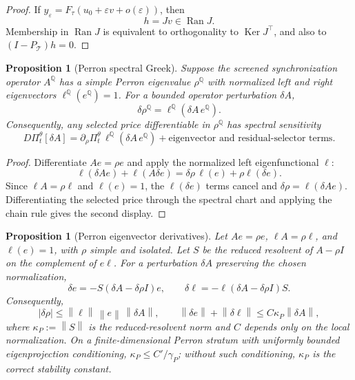 \documentclass[11pt,a4paper]{amsart}
\theoremstyle{plain}
\newtheorem{proposition}[theorem]{Proposition}
\theoremstyle{definition}
\theoremstyle{remark}
\DeclareMathOperator{\Ker}{Ker}
\DeclareMathOperator{\Ran}{Ran}
\newcommand{\QQ}{\mathbb{Q}}
\newcommand{\cT}{\mathcal{T}}
\newcommand{\eps}{\varepsilon}
\newcommand{\norm}[1]{\left\lVert #1\right\rVert}
\begin{document}
\begin{proof}
If \(y_\eps=F_\tau(u_0+\eps v+o(\eps))\), then
\[
        h=Jv\in\Ran J.
\]
Membership in \(\Ran J\) is equivalent to orthogonality to \(\Ker J^\top\), and also to
\((I-P_{\cT})h=0\).
\end{proof}

\begin{proposition}[Perron spectral Greek]\label{prop:spectral-greek}
Suppose the screened synchronization operator \(A^\QQ\) has a simple Perron eigenvalue
\(\rho^\QQ\) with normalized left and right eigenvectors \(\ell^\QQ(e^\QQ)=1\).  For a bounded
operator perturbation \(\delta A\),
\[
        \delta\rho^\QQ
        =
        \ell^\QQ(\delta A\,e^\QQ).
\]
Consequently, any selected price differentiable in \(\rho^\QQ\) has spectral sensitivity
\[
        D\Pi_t^\theta[\delta A]
        =
        \partial_{\rho}\Pi_t^\theta\,
        \ell^\QQ(\delta A\,e^\QQ)
        +
        \text{eigenvector and residual-selector terms}.
\]
\end{proposition}

\begin{proof}
Differentiate \(Ae=\rho e\) and apply the normalized left eigenfunctional \(\ell\):
\[
        \ell(\delta A e)+\ell(A\delta e)
        =
        \delta\rho\,\ell(e)+\rho\ell(\delta e).
\]
Since \(\ell A=\rho\ell\) and \(\ell(e)=1\), the \(\ell(\delta e)\) terms cancel and
\(\delta\rho=\ell(\delta A e)\).  Differentiating the selected price through the spectral chart
and applying the chain rule gives the second display.
\end{proof}

\begin{proposition}[Perron eigenvector derivatives]\label{prop:perron-eigenvector-derivatives}
Let \(A e=\rho e\), \(\ell A=\rho\ell\), and \(\ell(e)=1\), with \(\rho\) simple and
isolated.  Let \(S\) be the reduced resolvent of \(A-\rho I\) on the complement of
\(e\ell\).  For a perturbation \(\delta A\) preserving the chosen normalization,
\[
        \delta e=-S(\delta A-\delta\rho I)e,
        \qquad
        \delta\ell=-\ell(\delta A-\delta\rho I)S .
\]
Consequently,
\[
        |\delta\rho|\le\norm{\ell}\,\norm{e}\,\norm{\delta A},
        \qquad
        \norm{\delta e}+\norm{\delta\ell}
        \le
        C\kappa_P\norm{\delta A},
\]
where \(\kappa_P:=\norm{S}\) is the reduced-resolvent norm and \(C\) depends only on the local
normalization.  On a finite-dimensional Perron stratum with uniformly bounded eigenprojection
conditioning, \(\kappa_P\le C'/\gamma_P\); without such conditioning, \(\kappa_P\) is the correct
stability constant.
\end{proposition}
\end{document}
